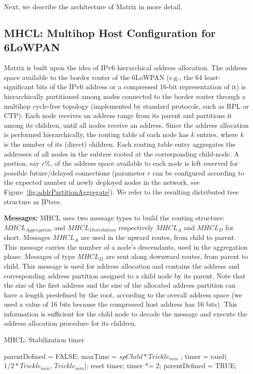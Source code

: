 Next, we describe the architecture of Matrix in more detail.

\subsection{MHCL: Multihop Host Configuration for 6LoWPAN}
\label{subsec:mhcl}

Matrix is built upon the idea of IPv6 hierarchical address allocation. The address space available to the border router of the 6LoWPAN (e.g., the 64 least-significant bits of the IPv6 address or a compressed 16-bit representation of it) is hierarchically partitioned among nodes connected to the border router through a multihop cycle-free topology (implemented by standard protocols, such as RPL or CTP). Each node receives an address range from its parent and partitions it among its children, until all nodes receive an address. Since the address allocation is performed hierarchically, the routing table of each node has $k$ entries, where $k$ is the number of its (direct) children. Each routing table entry aggregates the addresses of all nodes in the subtree rooted at the corresponding child-node. A portion, say $r\%$, of the address space available to each node is left reserved for possible future/delayed connections (parameter $r$ can be configured according to the expected number of newly deployed nodes in the network, see Figure~\ref{fig:addrPartitionAggregate}). We refer to the resulting distributed tree structure as IPtree.

\textbf{Messages:} MHCL uses two message types to build the routing structure: $MHCL_{Aggregation}$ and $MHCL_{Distribution}$ respectively $MHCL_{A}$ and $MHCL_{D}$ for short. Messages $MHCL_{A}$ are used in the upward routes, from child to parent. This message carries the number of a node's descendants, used in the aggregation phase. Messages of type $MHCL_{D}$ are sent along downward routes, from parent to child. This message is used for address allocation and contains the address and corresponding address partition assigned to a child node by its parent. Note that the size of the first address and the size of the allocated address partition can have a length predefined by the root, according to the overall address space (we used a value of 16 bits because the compressed host address has 16 bits). This information is sufficient for the child node to decode the message and execute the address allocation procedure for its children.

\begin{algorithm}[!t]
\caption{MHCL: Stabilization timer}\label{alg:stabilization}
\begin{algorithmic}[1]
\State parentDefined = FALSE;
\State maxTime = $spChild * Trickle_{min}$ ;
\State timer = rand($1/2 * Trickle_{min}$, $Trickle_{min}$]; 
            \State reset timer;
        \Else
            \State timer *= 2; 
        \Else
            \State parentDefined = TRUE;
        \EndIf
        \EndIf
    \EndIf
\EndWhile
\end{algorithmic}
\end{algorithm}

